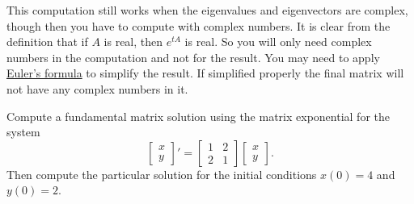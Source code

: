 This computation still works when the eigenvalues and
eigenvectors are complex, though then you have to compute with complex
numbers.  It is clear from the definition that if $A$ is real,
then $e^{tA}$ is real.  So you will only need complex numbers in the
computation and not for the result.  You may need to apply
\hyperref[eulersformula]{Euler's formula} to simplify the
result.  If simplified properly the final matrix will not have any complex
numbers in it.

\begin{example}
Compute a fundamental matrix solution using the matrix exponential
for the system
\begin{equation*}
\begin{bmatrix}
x \\ y
\end{bmatrix} '
=
\begin{bmatrix}
1 & 2 \\
2 & 1
\end{bmatrix}
\begin{bmatrix}
x \\ y
\end{bmatrix} .
\end{equation*}
Then compute the particular solution for the initial conditions
$x(0) = 4$ and $y(0) = 2$.


\end{example}
